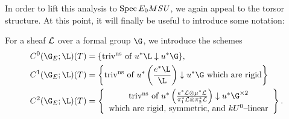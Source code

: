 In order to lift this analysis to $\operatorname{Spec} E_0 M\mathit{SU}$, we again appeal to the torsor structure.  At this point, it will finally be useful to introduce some notation:
\begin{definition}
For a sheaf $\mathcal{L}$ over a formal group $\G$, we introduce the schemes
\begin{align*}
C^0(\G_E; \L)(T) & = \{\text{triv\textsuperscript{ns} of $u^* \L \downarrow u^* \G$}\} , \\
C^1(\G_E; \L)(T) & = \left\{\text{triv\textsuperscript{ns} of $u^* \left( \frac{e^* \L}{\L} \right) \downarrow u^* \G$ which are rigid}\right\} \\
C^2(\G_E; \L)(T) & = \left\{\begin{array}{c}\text{triv\textsuperscript{ns} of $u^*\left(\frac{e^* \sheaf L \otimes \mu^* \sheaf L}{\pi_1^* \sheaf L \otimes \pi_2^* \sheaf L}\right) \downarrow u^* \G^{\times 2}$} \\ \text{which are rigid, symmetric, and $kU^0$--linear} \end{array}\right\}.
\end{align*}
\end{definition}

